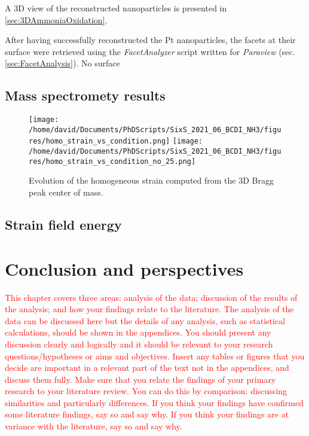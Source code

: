 A 3D view of the reconstructed nanoparticles is presented in \ref{sec:3DAmmoniaOxidation}.

After having successfully reconstructed the Pt nanoparticles, the facets at their surface were retrieved using the \textit{FacetAnalyzer} script written for \textit{Paraview} (sec. \ref{sec:FacetAnalysis}).
No surface

\subsection{Mass spectromety results}

\begin{figure}[!htb]
    \centering
    \texttt{[image: /home/david/Documents/PhDScripts/SixS\_2021\_06\_BCDI\_NH3/figures/homo\_strain\_vs\_condition.png]}
    \texttt{[image: /home/david/Documents/PhDScripts/SixS\_2021\_06\_BCDI\_NH3/figures/homo\_strain\_vs\_condition\_no\_25.png]}
    \caption{
        Evolution of the homogeneous strain computed from the 3D Bragg peak center of mass.
    }
    \label{fig:AmaterasuStrainSlices}
\end{figure}

\subsection{Strain field energy}



\section{Conclusion and perspectives}

\textcolor{red}{This chapter covers three areas: analysis of the data; discussion of the results of the analysis; and how your findings relate to the literature. The analysis of the data can be discussed here but the details of any analysis, such as statistical calculations, should be shown in the appendices. You should present any discussion clearly and logically and it should be relevant to your research questions/hypotheses or aims and objectives. Insert any tables or figures that you decide are important in a relevant part of the text not in the appendices, and discuss them fully. Make sure that you relate the findings of your primary research to your literature review. You can do this by comparison: discussing similarities and particularly differences. If you think your findings have confirmed some literature findings, say so and say why. If you think your findings are at variance with the literature, say so and say why.}

